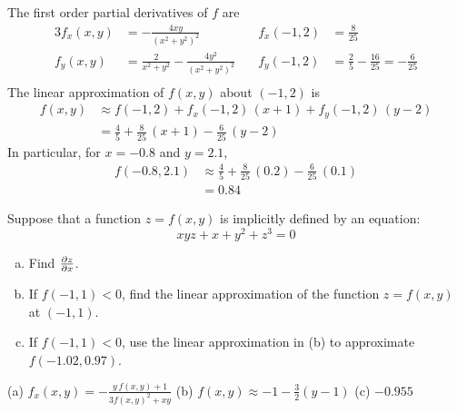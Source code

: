 \begin{solution}
The first order partial derivatives of $f$ are
\begin{alignat*}{3}
f_x(x,y) & = -\frac{4xy}{{(x^2+y^2)}^2}\quad &
      f_x(-1,2) & = \frac{8}{25} \\
f_y(x,y) & = \frac{2}{x^2+y^2}-\frac{4y^2}{{(x^2+y^2)}^2}\quad &
      f_y(-1,2) & = \frac{2}{5}-\frac{16}{25}
                  =-\frac{6}{25} \\
\end{alignat*}
The linear approximation of $f(x,y)$ about $(-1,2)$ is
\begin{align*}
f(x,y)&\approx f(-1,2) + f_x(-1,2)\,(x+1) + f_y(-1,2)\,(y-2) \\
      &=\frac{4}{5} +\frac{8}{25}\,(x+1) - \frac{6}{25}\,(y-2)
\end{align*}
In particular, for $x=-0.8$ and $y=2.1$,
\begin{align*}
f(-0.8,2.1)&\approx \frac{4}{5} +\frac{8}{25}\,(0.2) - \frac{6}{25}\,(0.1) \\
           &=0.84
\end{align*}
\end{solution}

\begin{question}[M200 2012D] %
Suppose that a function $z = f (x, y)$ is implicitly defined by an equation:
\begin{equation*}
         xyz + x + y^2 + z^3 = 0
\end{equation*}
\begin{enumerate}[(a)]
\item
Find $\pdiff{z}{x}$.
\item
If $f(-1, 1) < 0$, find the linear approximation of the function 
$z = f (x, y)$ at $(-1, 1)$.
\item
If $f(-1, 1) < 0$, use the linear approximation in (b) to approximate $f(-1.02, 0.97)$.
\end{enumerate}
\end{question}

%

\begin{answer}
(a) $f_x(x,y) = -\frac{y\,f(x,y) +1}{3f(x,y)^2 +xy}$\qquad
(b) $f(x,y) \approx  -1 -\frac{3}{2} (y-1)$\qquad
(c) $-0.955$
\end{answer}

